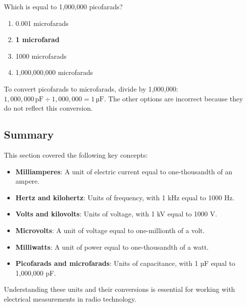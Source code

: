\begin{tcolorbox}[colback=gray!10!white,colframe=black!75!black,title={T5B08}]
    Which is equal to 1,000,000 picofarads?
    \begin{enumerate}[label=\Alph*),noitemsep]
        \item 0.001 microfarads
        \item \textbf{1 microfarad}
        \item 1000 microfarads
        \item 1,000,000,000 microfarads
    \end{enumerate}
\end{tcolorbox}
To convert picofarads to microfarads, divide by 1,000,000: \(1,000,000 \, \text{pF} \div 1,000,000 = 1 \, \text{µF}\). The other options are incorrect because they do not reflect this conversion.

\subsection*{Summary}
This section covered the following key concepts:
\begin{itemize}
    \item \textbf{Milliamperes}: A unit of electric current equal to one-thousandth of an ampere.
    \item \textbf{Hertz and kilohertz}: Units of frequency, with 1 kHz equal to 1000 Hz.
    \item \textbf{Volts and kilovolts}: Units of voltage, with 1 kV equal to 1000 V.
    \item \textbf{Microvolts}: A unit of voltage equal to one-millionth of a volt.
    \item \textbf{Milliwatts}: A unit of power equal to one-thousandth of a watt.
    \item \textbf{Picofarads and microfarads}: Units of capacitance, with 1 µF equal to 1,000,000 pF.
\end{itemize}
Understanding these units and their conversions is essential for working with electrical measurements in radio technology.
